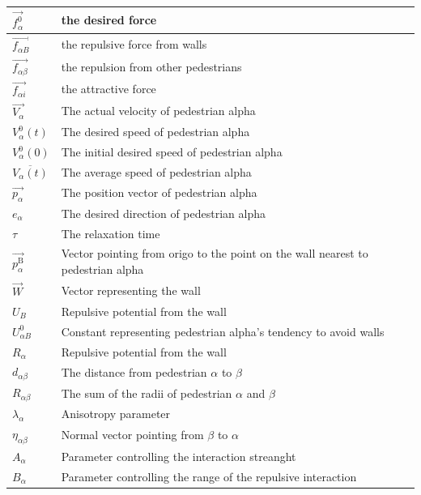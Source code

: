 \begin{center}
\begin{tabular}{lll}
\hline
$\overrightarrow{f_{\alpha}^{0}}$ & the desired force &\\
\hline
$\overrightarrow{f_{\alpha B}}$ & the repulsive force from walls &\\
\hline
$\overrightarrow{f_{\alpha \beta}}$ & the repulsion from other pedestrians\\
\hline
$\overrightarrow{f_{\alpha i}}$& the attractive force\\
\hline
$\overrightarrow{V_{\alpha}}$ & The actual velocity of pedestrian alpha &\\
\hline
$V_{\alpha}^{0}(t)$ & The desired speed of pedestrian alpha &\\
\hline
$V_{\alpha}^{0}(0)$ & The initial desired speed of pedestrian alpha &\\
\hline
$\overline{V_{\alpha}(t)}$ & The average speed of pedestrian alpha &\\
\hline
$\overrightarrow{p_{\alpha}}$ & The position vector of pedestrian alpha\\
\hline
$e_{\alpha}$& The desired direction of pedestrian alpha\\
\hline
$\tau$& The relaxation time &\\
\hline
$\overrightarrow{p_{\alpha}^{\text{B}}}$& Vector pointing from origo to the point on the wall nearest to pedestrian alpha &\\
\hline
$\overrightarrow{W}$& Vector representing the wall &\\
\hline
$U_{B}$ & Repulsive potential from the wall\\
\hline
$U^{0}_{\alpha B}$ & Constant representing pedestrian alpha's tendency to avoid walls\\
\hline
$R_{\alpha}$& Repulsive potential from the wall\\
\hline
$d_{\alpha \beta}$& The distance from pedestrian $\alpha$ to $\beta$ &\\
\hline
$R_{\alpha\beta}$& The sum of the radii of pedestrian $\alpha$ and $\beta$ \\
\hline
$\lambda_{\alpha}$& Anisotropy parameter &\\
\hline
$\eta_{\alpha \beta}$& Normal vector pointing from $\beta$ to $\alpha$ \\
\hline
$A_{\alpha}$& Parameter controlling the interaction streanght \\
\hline
$B_{\alpha}$& Parameter controlling the range of the repulsive interaction  \\

\end{tabular}
\end{center}

